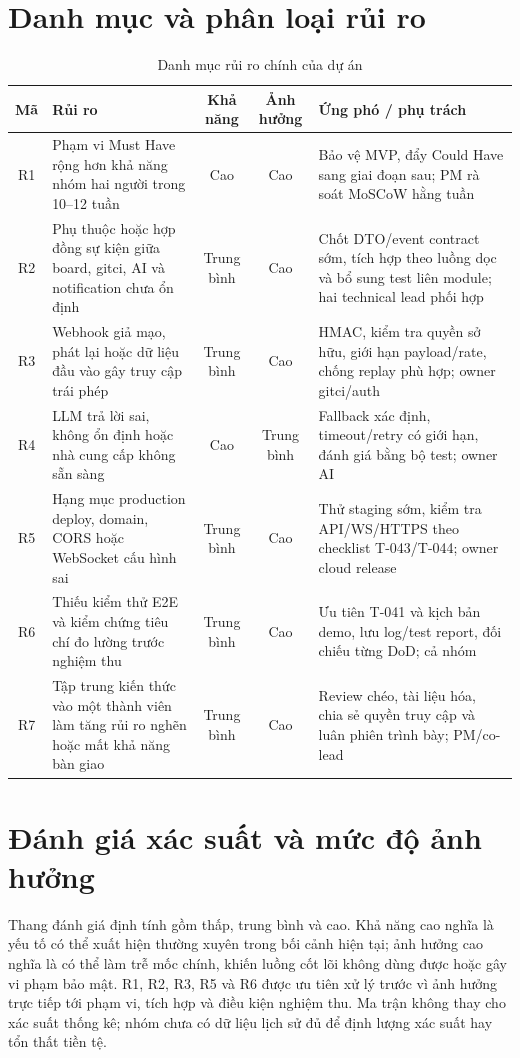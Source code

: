 \documentclass[12pt,a4paper]{report}
\begin{document}
\section{Danh mục và phân loại rủi ro}
\begin{table}[H]
\centering
\caption{Danh mục rủi ro chính của dự án}
\small
\begin{tabularx}{\textwidth}{|c|X|c|c|X|}
\hline
\textbf{Mã} & \textbf{Rủi ro} & \textbf{Khả năng} & \textbf{Ảnh hưởng} & \textbf{Ứng phó / phụ trách} \\
\hline
R1 & Phạm vi Must Have rộng hơn khả năng nhóm hai người trong 10–12 tuần & Cao & Cao & Bảo vệ MVP, đẩy Could Have sang giai đoạn sau; PM rà soát MoSCoW hằng tuần \\
R2 & Phụ thuộc hoặc hợp đồng sự kiện giữa board, gitci, AI và notification chưa ổn định & Trung bình & Cao & Chốt DTO/event contract sớm, tích hợp theo luồng dọc và bổ sung test liên module; hai technical lead phối hợp \\
R3 & Webhook giả mạo, phát lại hoặc dữ liệu đầu vào gây truy cập trái phép & Trung bình & Cao & HMAC, kiểm tra quyền sở hữu, giới hạn payload/rate, chống replay phù hợp; owner gitci/auth \\
R4 & LLM trả lời sai, không ổn định hoặc nhà cung cấp không sẵn sàng & Cao & Trung bình & Fallback xác định, timeout/retry có giới hạn, đánh giá bằng bộ test; owner AI \\
R5 & Hạng mục production deploy, domain, CORS hoặc WebSocket cấu hình sai & Trung bình & Cao & Thử staging sớm, kiểm tra API/WS/HTTPS theo checklist T-043/T-044; owner cloud release \\
R6 & Thiếu kiểm thử E2E và kiểm chứng tiêu chí đo lường trước nghiệm thu & Trung bình & Cao & Ưu tiên T-041 và kịch bản demo, lưu log/test report, đối chiếu từng DoD; cả nhóm \\
R7 & Tập trung kiến thức vào một thành viên làm tăng rủi ro nghẽn hoặc mất khả năng bàn giao & Trung bình & Cao & Review chéo, tài liệu hóa, chia sẻ quyền truy cập và luân phiên trình bày; PM/co-lead \\
\hline
\end{tabularx}
\end{table}

\section{Đánh giá xác suất và mức độ ảnh hưởng}
Thang đánh giá định tính gồm thấp, trung bình và cao. Khả năng cao nghĩa là yếu tố có thể xuất hiện thường xuyên trong bối cảnh hiện tại; ảnh hưởng cao nghĩa là có thể làm trễ mốc chính, khiến luồng cốt lõi không dùng được hoặc gây vi phạm bảo mật. R1, R2, R3, R5 và R6 được ưu tiên xử lý trước vì ảnh hưởng trực tiếp tới phạm vi, tích hợp và điều kiện nghiệm thu. Ma trận không thay cho xác suất thống kê; nhóm chưa có dữ liệu lịch sử đủ để định lượng xác suất hay tổn thất tiền tệ.
\end{document}
